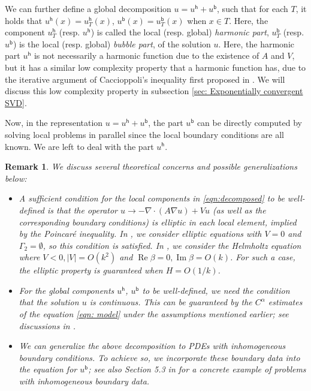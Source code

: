 \documentclass[12pt]{caltech_thesis}
\newtheorem{remark}[theorem]{Remark}
\numberwithin{equation}{section}
\begin{document}
We can further define a global decomposition $u=u^{\mathsf{h}}+u^{\mathsf{b}}$, such that for each $T$, it holds that $u^{\mathsf{h}}(x)=u^{\mathsf{h}}_T(x)$, $u^{\mathsf{b}}(x)=u^{\mathsf{b}}_T(x)$ when $x \in T$. 
 Here, the component $u^{\mathsf{h}}_T$ (resp. $u^{\mathsf{h}}$) is called the local (resp. global) \textit{harmonic part}, $u^{\mathsf{b}}_T$ (resp. $u^{\mathsf{b}}$) is the local (resp. global) \textit{bubble part}, of the solution $u$. Here, the harmonic part $u^\mathsf{h}$ is not necessarily a harmonic function due to the existence of $A$ and $V$, but it has a similar low complexity property that a harmonic function has, due to the iterative argument of Caccioppoli's inequality first proposed in \cite{babuska2011optimal}. We will discuss this low complexity property in subsection \ref{sec: Exponentially convergent SVD}.
 
 Now, in the representation $u=u^{\mathsf{h}}+u^{\mathsf{b}}$, the part $u^{\mathsf{b}}$ can be directly computed by solving local problems in parallel since the local boundary conditions are all known. We are left to deal with the part $u^\mathsf{h}$.
\begin{remark}
\label{rmk: harmonic bubble splitting}
    We discuss several theoretical concerns and possible generalizations below:
\begin{itemize}
    \item A sufficient condition for the local components in \eqref{eqn:decomposed} to be well-defined is that the operator $u \to -\nabla \cdot (A \nabla u) + Vu$ (as well as the corresponding boundary conditions) is elliptic in each local element, implied by the Poincar\'e inequality. In \cite{chen2021exponential}, we consider elliptic equations with $V = 0$ and $\Gamma_2 = \emptyset$, so this condition is satisfied. In \cite{chen2023exponentially}, we consider the Helmholtz equation where $V <0, |V|=O(k^2)$ and $\operatorname{Re}\beta =0, \operatorname{Im}\beta = O(k)$. For such a case, the elliptic property is guaranteed when $H = O(1/k)$.
    \item For the global components $u^\mathsf{h}$, $u^{\mathsf{b}}$ to be well-defined, we need the condition that the solution $u$ is continuous. This can be guaranteed by the $C^{\alpha}$ estimates of the equation \eqref{eqn: model} under the assumptions mentioned earlier; see discussions in \cite{chen2021exponential,chen2023exponentially}.
    \item We can generalize the above decomposition to PDEs with inhomogeneous boundary conditions. To achieve so, we incorporate these boundary data into the equation for $u^\mathsf{b}$; see also Section 5.3 in \cite{chen2023exponentially} for a concrete example of problems with inhomogeneous boundary data.
\end{itemize}
\end{remark}
\end{document}
